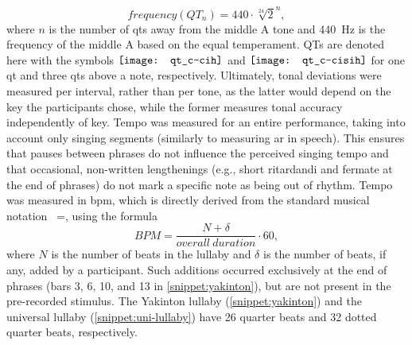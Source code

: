 %
\begin{equation}
	\label{eq:quarter_tones_formula}
	frequency(QT_n) = 440 \cdot \sqrt[24]{2}^n,
\end{equation}
\noindent
%
where $n$ is the number of \acp{qt} away from the middle A tone \citep[cf.][]{DeKlerk1979equal} and \SI{440}{\hertz} is the frequency of the middle A based on the equal temperament.
QTs are denoted here with the symbols \hspace{-0.26cm}
$\vcenter{\hbox{\texttt{[image: qt\_c-cih]}}}$ and 
$\vcenter{\hbox{\texttt{[image: qt\_c-cisih]}}}$ for one \ac{qt} and three \acp{qt} above a note, respectively.
Ultimately, tonal deviations were measured per interval, rather than per tone, as the latter would depend on the key the participants chose, while the former measures tonal accuracy independently of key.
Tempo was measured for an entire performance, taking into account only singing segments (similarly to measuring \ac{ar} in speech).
This ensures that pauses between phrases do not influence the perceived singing tempo and that occasional, non-written lengthenings (e.g., short ritardandi and fermate at the end of phrases) do not mark a specific note as being out of rhythm.
Tempo was measured in \acf{bpm}, which is directly derived from the standard musical notation \musQuarter~=, using the formula
%
\begin{equation}
	\label{eq:bpm}
	BPM = \frac{N + \delta}{overall\ duration} \cdot 60,
\end{equation}
\noindent
%
where $N$ is the number of beats in the lullaby and $\delta$ is the number of beats, if any, added by a participant.
Such additions occurred exclusively at the end of phrases (bars 3, 6, 10, and 13 in \cref{snippet:yakinton}), but are not present in the pre-recorded stimulus.
The Yakinton lullaby (\cref{snippet:yakinton}) and the universal lullaby (\cref{snippet:uni-lullaby}) have 26 quarter beats and 32 dotted quarter beats, respectively.

